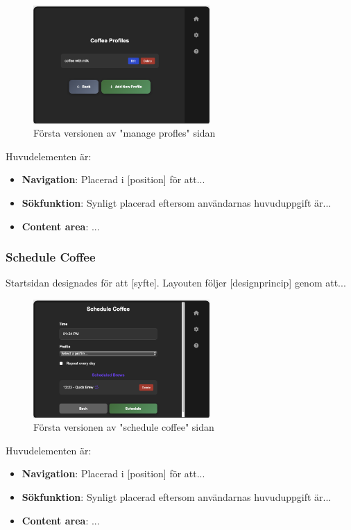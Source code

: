 \begin{figure}[H]
    \centering
    \includegraphics[width=0.6\textwidth]{bilder/manage.png}
    \caption{Första versionen av "manage profles" sidan}
    \label{fig:manage_v1}
\end{figure}

Huvudelementen är:
\begin{itemize}
    \item \textbf{Navigation}: Placerad i [position] för att...
    \item \textbf{Sökfunktion}: Synligt placerad eftersom användarnas huvuduppgift är...
    \item \textbf{Content area}: ...
\end{itemize}


\subsubsection{Schedule Coffee}

Startsidan designades för att [syfte]. Layouten följer [designprincip] genom att...

\begin{figure}[H]
    \centering
    \includegraphics[width=0.6\textwidth]{bilder/schedule.png}
    \caption{Första versionen av "schedule coffee" sidan}
    \label{fig:schedule_v1}
\end{figure}

Huvudelementen är:
\begin{itemize}
    \item \textbf{Navigation}: Placerad i [position] för att...
    \item \textbf{Sökfunktion}: Synligt placerad eftersom användarnas huvuduppgift är...
    \item \textbf{Content area}: ...
\end{itemize}
